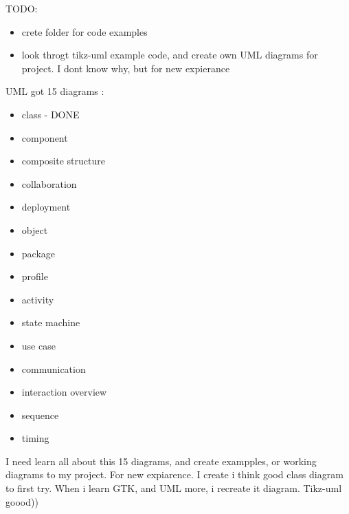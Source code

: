 \documentclass{article}
\begin{document}
TODO:
\begin{itemize}
  \item crete folder for code examples
  \item look throgt tikz-uml example code, and create own UML diagrams for project. I dont know why, but for new expierance
\end{itemize}
\newpage
{}
UML got 15 diagrams :\\
\begin{itemize}
  \item class - DONE
  \item component
  \item composite structure
  \item collaboration
  \item deployment
  \item object
  \item package 
  \item profile
  \item activity
  \item state machine
  \item use case
  \item communication
  \item interaction overview
  \item sequence
  \item timing
\end{itemize}
I need learn all about this 15 diagrams, and create exampples, or working diagrams to my project. For new expiarence.
I create i think good class diagram to first try. When i learn GTK, and UML more, i recreate it diagram. Tikz-uml goood))
\end{document}
